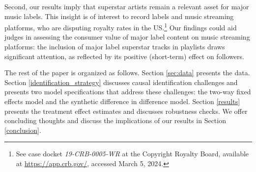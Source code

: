 Second, our results imply that superstar artists remain a relevant asset for major music labels. This insight is of interest to record labels and music streaming platforms, who are disputing royalty rates in the US.\footnote{See case docket \textit{19-CRB-0005-WR} at the Copyright Royalty Board, available at \href{https://app.crb.gov/case/detail/19-CRB-0005-WR\%20\%282021-2025\%29}{https://app.crb.gov/}, accessed March 5, 2024.} Our findings could aid judges in assessing the consumer value of major label content on music streaming platforms: the inclusion of major label superstar tracks in playlists draws significant attention, as reflected by its positive (short-term) effect on followers. %



The rest of the paper is organized as follows. Section \ref{sec:data} presents the data. Section \ref{identification_strategy} discusses causal identification challenges and presents two model specifications that address these challenges: the two-way fixed effects model and the synthetic difference in difference model. Section \ref{results} presents the treatment effect estimates and discusses robustness checks. %
We offer concluding thoughts and discuss the implications of our results in Section \ref{conclusion}.
